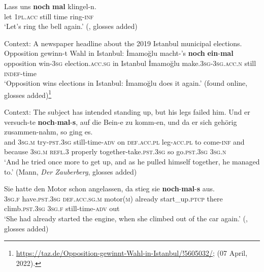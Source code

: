 \begin{exe}
	\ex\label{exAppendixGermanIterativeViaIncrement1}
	\gll Lass uns \textbf{noch} \textbf{mal} klingel-n.\\
	let 1\textsc{pl}.\textsc{acc} still time ring-\textsc{inf}\\
	\glt \lq Let's ring the bell again.\rq{ }(\cite[s.v. \textit{nochmal}]{Duden}, glosses added)

	\ex\label{exAppendixGermanIterativeViaIncrement2}
	Context: A newspaper headline about the 2019 Istanbul municipal elections.\\
	\gll Opposition gewinn-t Wahl in Istanbul: İmamoğlu macht-'s \textbf{noch} \textbf{ein}-\textbf{mal}\\
	opposition win-3\textsc{sg} election.\textsc{acc}.\textsc{sg} in Istanbul İmamoğlu make.3\textsc{sg}-3\textsc{sg}.\textsc{acc}.\textsc{n} still \textsc{indef}-time\\
	\glt \lq Opposition wins elections in Istanbul: İmamoğlu does it again.\rq{ }(found online, glosses added)\footnote{\url{https://taz.de/Opposition-gewinnt-Wahl-in-Istanbul/!5605032/}; (07 April, 2022).}
	
	\ex Context: The subject has intended standing up, but his legs failed him.\label{exAppendixGermanIterativeViaIncrement3}
	\exi{}\gll Und er versuch-te \textbf{noch}-\textbf{mal}-\textbf{s}, auf die Bein-e zu komm-en, und da er sich gehörig zusammen-nahm, so ging es.\\
	and 3\textsc{sg}.\textsc{m} try-\textsc{pst}.3\textsc{sg} still-time-\textsc{adv} on \textsc{def}.\textsc{acc}.\textsc{pl} leg-\textsc{acc}.\textsc{pl} to come-\textsc{inf} and because 3\textsc{sg}.\textsc{m} \textsc{refl}.3 properly together-take.\textsc{pst}.3\textsc{sg} so go.\textsc{pst}.3\textsc{sg} 3\textsc{sg}.\textsc{n}\\
	\glt \lq And he tried once more to get up, and as he pulled himself together, he managed to.' (Mann, \textit{Der Zauberberg}, glosses added)

	\ex\label{exAppendixGermanIterativeViaIncrement4}
	\gll Sie hatte den Motor schon angelassen, da stieg sie \textbf{noch}-\textbf{mal}-\textbf{s} aus.\\
3\textsc{sg}.\textsc{f} have.\textsc{pst}.3\textsc{sg} \textsc{def}.\textsc{acc}.\textsc{sg}.\textsc{m} motor(\textsc{m}) already start\_up.\textsc{ptcp} there climb.\textsc{pst}.3\textsc{sg} 3\textsc{sg}.\textsc{f} still-time-\textsc{adv} out\\
\glt \lq She had already started the engine, when she climbed out of the car again.' (\cite[s.v. \textit{nochmals}]{Duden}, glosses added)


\end{exe}
